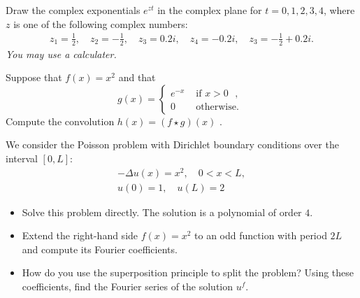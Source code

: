 \documentclass[11pt]{article}
\begin{document}

\begin{exercise}
    Draw the complex exponentials $e^{zt}$ in the complex plane for $t=0,1,2,3,4$, 
    where $z$ is one of the following complex numbers:
    \begin{gather*}
        z_1 = \frac 1 2,
        \quad 
        z_2 = - \frac 1 2,
        \quad 
        z_3 = 0.2i,
        \quad 
        z_4 = -0.2i,
        \quad 
        z_3 = - \frac 1 2 + 0.2i
        .
    \end{gather*}
    \textit{You may use a calculater.}
\end{exercise}

\begin{solution}     
\end{solution}

\begin{exercise}
    Suppose that $f(x) = x^2$ and that
    \[
        g(x) = \left\{\begin{array}{cc} e^{-x} & \text{ if $x > 0$ }, \\ 0 & \text{ otherwise. } \end{array}\right.
    \]
    Compute the convolution $h(x) = (f \star g)(x)$ .
\end{exercise}

\begin{solution}     
\end{solution}

\begin{exercise}
    We consider the Poisson problem with Dirichlet boundary conditions over the interval $[0,L]$:
    \begin{gather*}
        - \Delta u(x) = x^2, \quad 0 < x < L,
        \\
        u(0) = 1, \quad u(L) = 2
    \end{gather*}
    \begin{itemize}
        \item Solve this problem directly. The solution is a polynomial of order $4$.
        \item Extend the right-hand side $f(x) = x^2$ to an odd function with period $2L$ and compute its Fourier coefficients.
        \item How do you use the superposition principle to split the problem? Using these coefficients, find the Fourier series of the solution $u^f$.
    \end{itemize}
\end{exercise}
\begin{solution}     
\end{solution}
\end{document}
